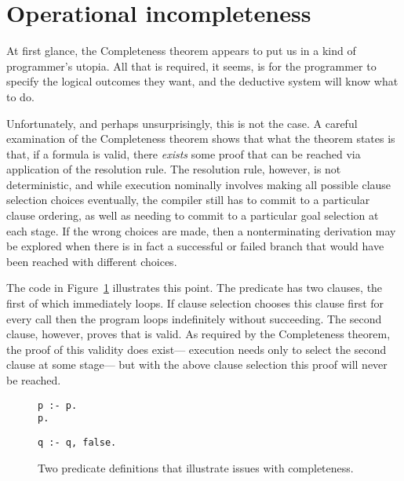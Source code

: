 \label{end:op-sem}


\section{Operational incompleteness}
\label{sec:incompleteness}

At first glance,
the Completeness theorem appears to put us in
a kind of programmer's utopia.
All that is required, it seems,
is for the programmer to specify the logical outcomes they want,
and the deductive system will know what to do.

Unfortunately, and perhaps unsurprisingly, this is not the case.
A careful examination of the Completeness theorem shows that
what the theorem states is that, if a formula is valid,
there \emph{exists} some proof that can be reached
via application of the resolution rule.
The resolution rule, however, is not deterministic,
and while execution nominally involves
making all possible clause selection choices eventually,
the compiler still has to commit to a particular clause ordering,
as well as needing to commit to a particular goal selection at each stage.
If the wrong choices are made,
then a nonterminating derivation may be explored
when there is in fact a successful or failed branch
that would have been reached with different choices.

The code in Figure~\ref{fig:incompleteness} illustrates this point.
The predicate  has two clauses,
the first of which immediately loops.
If clause selection chooses this clause first for every call
then the program loops indefinitely without succeeding.
The second clause, however, proves that  is valid.
As required by the Completeness theorem,
the proof of this validity does exist---%
execution needs only to select the second clause at some stage---%
but with the above clause selection this proof will never be reached.

\begin{figure}
\begin{center}
\begin{minipage}[t]{9em}
\begin{verbatim}
p :- p.
p.
\end{verbatim}
\end{minipage}
\begin{minipage}[t]{9em}
\begin{verbatim}
q :- q, false.
\end{verbatim}
\end{minipage}
\end{center}
\caption{
Two predicate definitions that illustrate issues with completeness.
\label{fig:incompleteness}
}
\end{figure}

